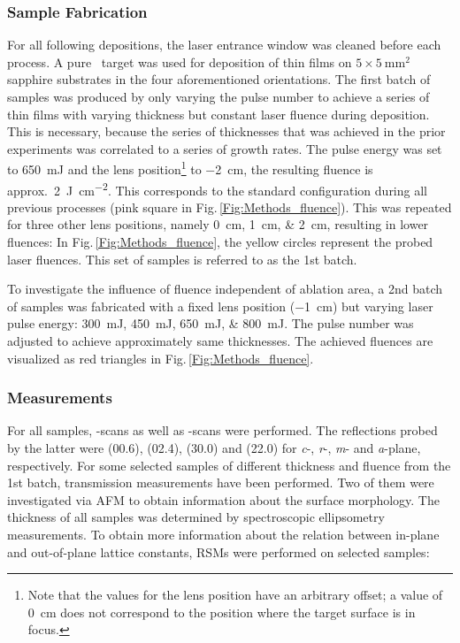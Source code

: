 \subsubsection{Sample Fabrication}
For all following depositions, the laser entrance window was cleaned before each process.
A pure \cro\ target was used for deposition of thin films on $5\times\qty{5}{\mm\squared}$ sapphire substrates in the four aforementioned orientations.
The first batch of samples was produced by only varying the pulse number to achieve a series of thin films with varying thickness but constant laser fluence during deposition.
This is necessary, because the series of thicknesses that was achieved in the prior experiments was correlated to a series of growth rates.
The pulse energy was set to \qty{650}{\milli\joule} and the lens position\footnote{
    Note that the values for the lens position have an arbitrary offset; a value of \qty{0}{\cm} does not correspond to the position where the target surface is in focus.
}
to \qty{-2}{\cm}, the resulting fluence is approx.\ \qty{2}{\joule\per\cm\squared}.
This corresponds to the standard configuration during all previous processes (pink square in Fig.\,\ref{Fig:Methods_fluence}).
This was repeated for three other lens positions, namely \qtylist{0;1;2}{\cm}, resulting in lower fluences:
In Fig.\,\ref{Fig:Methods_fluence}, the yellow circles represent the probed laser fluences.
This set of samples is referred to as the 1st batch.

To investigate the influence of fluence independent of ablation area, a 2nd batch of samples was fabricated with a fixed lens position (\qty{-1}{\cm}) but varying laser pulse energy:
\qtylist{300;450;650;800}{\milli\joule}.
The pulse number was adjusted to achieve approximately same thicknesses.
The achieved fluences are visualized as red triangles in Fig.\,\ref{Fig:Methods_fluence}.

\subsubsection{Measurements}
For all samples, \thetaomega-scans as well as \textomega-scans were performed.
The reflections probed by the latter were (00.6), (02.4), (30.0) and (22.0) for \textit{c}-, \textit{r}-, \textit{m}- and \textit{a}-plane, respectively.
For some selected samples of different thickness and fluence from the 1st batch, transmission measurements have been performed.
Two of them were investigated via \gls{AFM} to obtain information about the surface morphology.
The thickness of all samples was determined by spectroscopic ellipsometry measurements.
To obtain more information about the relation between in-plane and out-of-plane lattice constants, \glspl{RSM} were performed on selected samples:

